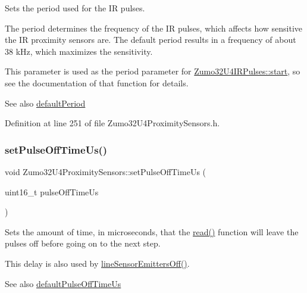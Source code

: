 Sets the period used for the IR pulses. 

The period determines the frequency of the IR pulses, which affects how sensitive the IR proximity sensors are. The default period results in a frequency of about 38 k\+Hz, which maximizes the sensitivity.

This parameter is used as the {\ttfamily period} parameter for \hyperlink{class_zumo32_u4_i_r_pulses_abef1e5f17a173505c6acc0f8c0d917d9}{Zumo32\+U4\+I\+R\+Pulses\+::start}, so see the documentation of that function for details.

\begin{DoxySeeAlso}{See also}
\hyperlink{class_zumo32_u4_proximity_sensors_a0857da91ca57c4f884094736bd1c0824}{default\+Period} 
\end{DoxySeeAlso}


Definition at line 251 of file Zumo32\+U4\+Proximity\+Sensors.\+h.

\mbox{\label{class_zumo32_u4_proximity_sensors_a4d7911aca58734a76be212de103a1387}} 
\subsubsection{\texorpdfstring{set\+Pulse\+Off\+Time\+Us()}{setPulseOffTimeUs()}}
{\footnotesize\ttfamily void Zumo32\+U4\+Proximity\+Sensors\+::set\+Pulse\+Off\+Time\+Us (\begin{DoxyParamCaption}\item[{uint16\+\_\+t}]{pulse\+Off\+Time\+Us }\end{DoxyParamCaption})\hspace{0.3cm}{\ttfamily [inline]}}



Sets the amount of time, in microseconds, that the \hyperlink{class_zumo32_u4_proximity_sensors_a071d935e10e2a16a3ae2559d16a12683}{read()} function will leave the pulses off before going on to the next step. 

This delay is also used by \hyperlink{class_zumo32_u4_proximity_sensors_a583dada6ad676cbda2ec7d55b05338b8}{line\+Sensor\+Emitters\+Off()}.

\begin{DoxySeeAlso}{See also}
\hyperlink{class_zumo32_u4_proximity_sensors_a60fcba68f8cc7f2710f32ac76de85cdf}{default\+Pulse\+Off\+Time\+Us} 
\end{DoxySeeAlso}


